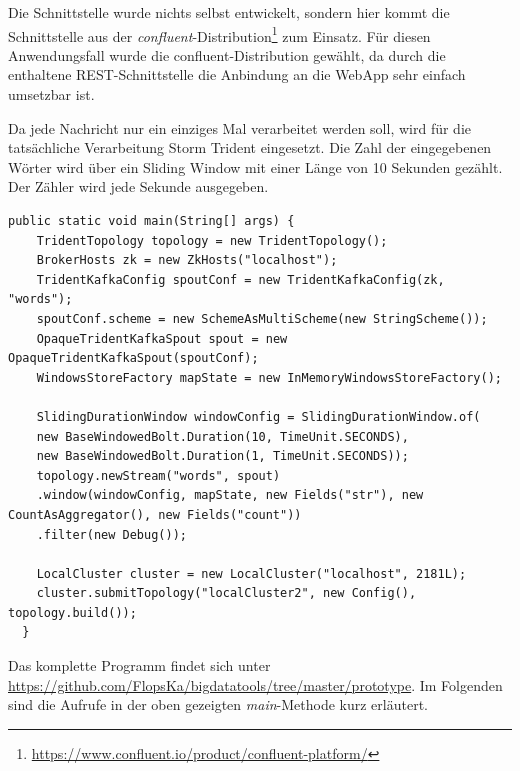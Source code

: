 \documentclass[a4paper,11pt]{scrartcl}
\begin{document}
  Die Schnittstelle wurde nichts selbst entwickelt, sondern hier kommt die
  Schnittstelle aus der
  \textit{confluent}-Distribution\footnote{\url{https://www.confluent.io/product/confluent-platform/}}
  zum Einsatz. Für diesen Anwendungsfall wurde die confluent-Distribution
  gewählt, da durch die enthaltene REST-Schnittstelle die Anbindung an die
  WebApp sehr einfach umsetzbar ist.

  Da jede Nachricht nur ein einziges Mal verarbeitet werden soll, wird für die
  tatsächliche Verarbeitung Storm Trident eingesetzt. Die Zahl der eingegebenen
  Wörter wird über ein Sliding Window mit einer Länge von 10 Sekunden gezählt.
  Der Zähler wird jede Sekunde ausgegeben.

  \begin{lstlisting}[caption={Beispielimplementierung zur Ermittlung der Tippgeschwindigkeit}]
  public static void main(String[] args) {
    TridentTopology topology = new TridentTopology();
    BrokerHosts zk = new ZkHosts("localhost");
    TridentKafkaConfig spoutConf = new TridentKafkaConfig(zk, "words");
    spoutConf.scheme = new SchemeAsMultiScheme(new StringScheme());
    OpaqueTridentKafkaSpout spout = new OpaqueTridentKafkaSpout(spoutConf);
    WindowsStoreFactory mapState = new InMemoryWindowsStoreFactory();

    SlidingDurationWindow windowConfig = SlidingDurationWindow.of(
    new BaseWindowedBolt.Duration(10, TimeUnit.SECONDS),
    new BaseWindowedBolt.Duration(1, TimeUnit.SECONDS));
    topology.newStream("words", spout)
    .window(windowConfig, mapState, new Fields("str"), new CountAsAggregator(), new Fields("count"))
    .filter(new Debug());

    LocalCluster cluster = new LocalCluster("localhost", 2181L);
    cluster.submitTopology("localCluster2", new Config(), topology.build());
  }
  \end{lstlisting}

  Das komplette Programm findet sich unter
  \url{https://github.com/FlopsKa/bigdatatools/tree/master/prototype}. Im
  Folgenden sind die Aufrufe in der oben gezeigten \textit{main}-Methode kurz
  erläutert. 
\end{document}
